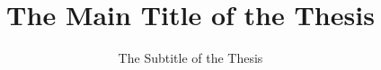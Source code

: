\documentclass[
  uofacolor,
  BCOR=12mm,     %
  open=odd,      %
  cleardoublepage=plain,
  DIV=15
]{uofathesis}
\author{\myfont{Albert Einstein}}
\title{\Huge The Main Title of the Thesis}
\subtitle{\LARGE The Subtitle of the Thesis}
\date{\myfont{October 2018}}
\begin{document}
\frontmatter

\maketitle

\makeadvisorpage


%
%
%

\tableofcontents

\newcommand{\p}[1]{\textcolor{uofadarkblue}{\texttt{#1}}}

\mainmatter






\appendix



\backmatter
\printbibliography
\end{document}
